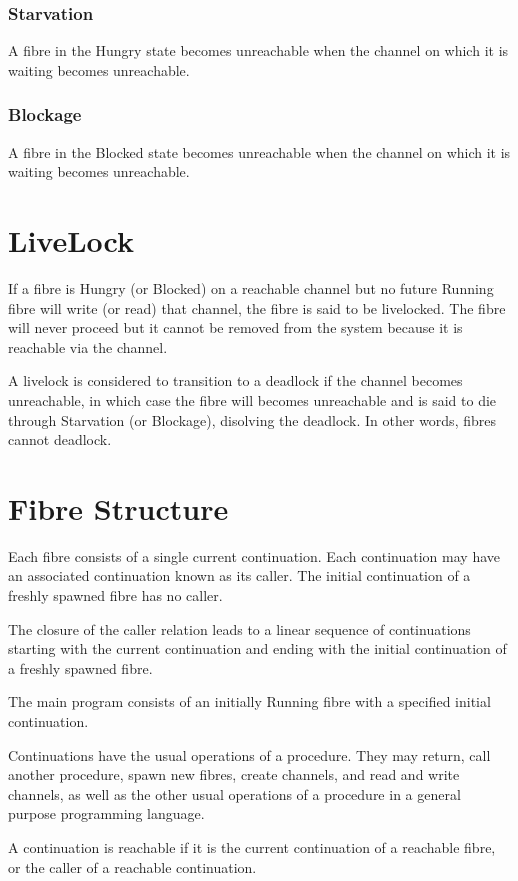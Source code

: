 \documentclass[oneside]{book}
\begin{document}
\subsubsection{Starvation}
A fibre in the Hungry state becomes unreachable when the
channel on which it is waiting becomes unreachable.

\subsubsection{Blockage}
A fibre in the Blocked state becomes unreachable 
when the channel on which it is waiting becomes unreachable.

\section{LiveLock}
If a fibre is Hungry (or Blocked) on a reachable channel
but no future Running fibre will write (or read) that
channel, the fibre is said to be livelocked. The fibre
will never proceed but it cannot be removed from
the system because it is reachable via the channel.

A livelock is considered to transition to a deadlock
if the channel becomes unreachable, in which case
the fibre will becomes unreachable and is said to
die through Starvation (or Blockage),
disolving the deadlock. In other words, fibres cannot deadlock.


\section{Fibre Structure}
Each fibre consists of a single current continuation.
Each continuation may have an associated continuation
known as its caller. The initial continuation of a freshly
spawned fibre has no caller.

The closure of the caller relation leads to a linear
sequence of continuations starting with the current
continuation and ending with the initial continuation
of a freshly spawned fibre.

The main program consists of an initially Running
fibre with a specified initial continuation.

Continuations have the usual operations of a procedure.
They may return, call another procedure, spawn new
fibres, create channels, and read and write channels,
as well as the other usual operations of a procedure
in a general purpose programming language.

A continuation is reachable if it is the current
continuation of a reachable fibre, or the caller
of a reachable continuation.
\end{document}
